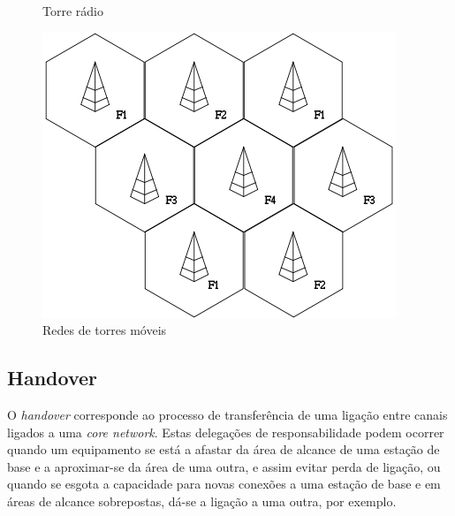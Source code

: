 \documentclass{llncs}
\begin{document}
\begin{figure}[H]
\begin{minipage}{0.45\textwidth}
        \caption{Torre rádio \cite{img1}}
    \end{minipage}\hfill
    \begin{minipage}{0.45\textwidth}
        \centering
        \includegraphics[scale=0.5]{network.png}
        \caption{Redes de torres móveis \cite{img2}}
    \end{minipage}
\end{figure}

\subsection{Handover}
\hspace*{1.5em} O \textit{handover} corresponde ao processo de transferência de uma ligação entre canais ligados a uma \textit{core network}. Estas delegações de responsabilidade podem ocorrer quando um equipamento se está a afastar da área de alcance de uma estação de base e a aproximar-se da área de uma outra, e assim evitar perda de ligação, ou quando se esgota a capacidade para novas conexões a uma estação de base e em áreas de alcance sobrepostas, dá-se a ligação a uma outra, por exemplo.
\end{document}

